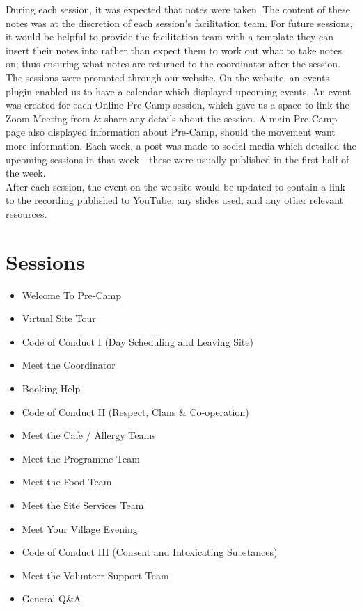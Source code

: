 During each session, it was expected that notes were taken. The content of these notes was at the discretion of each session's facilitation team. For future sessions, it would be helpful to provide the facilitation team with a template they can insert their notes into rather than expect them to work out what to take notes on; thus ensuring what notes are returned to the coordinator after the session.\\

The sessions were promoted through our website. On the website, an events plugin enabled us to have a calendar which displayed upcoming events. An event was created for each Online Pre-Camp session, which gave us a space to link the Zoom Meeting from \& share any details about the session. A main Pre-Camp page also displayed information about Pre-Camp, should the movement want more information. Each week, a post was made to social media which detailed the upcoming sessions in that week - these were usually published in the first half of the week.\\

After each session, the event on the website would be updated to contain a link to the recording published to YouTube, any slides used, and any other relevant resources. 

\section{Sessions}
\begin{itemize}
    \item Welcome To Pre-Camp
    \item Virtual Site Tour
    \item Code of Conduct I (Day Scheduling and Leaving Site)
    \item Meet the Coordinator
    \item Booking Help
    \item Code of Conduct II (Respect, Clans \& Co-operation)
    \item Meet the Cafe / Allergy Teams
    \item Meet the Programme Team
    \item Meet the Food Team
    \item Meet the Site Services Team
    \item Meet Your Village Evening
    \item Code of Conduct III (Consent and Intoxicating Substances)
    \item Meet the Volunteer Support Team
    \item General Q\&A
\end{itemize}

